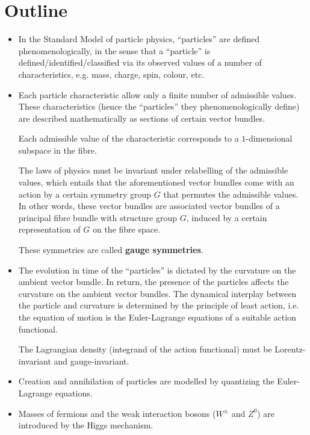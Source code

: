 

\chapter{Outline}
\setcounter{theorem}{0}
\setcounter{equation}{0}


\renewcommand{\theenumi}{\roman{enumi}}
\renewcommand{\labelenumi}{\textnormal{(\theenumi)}$\;\;$}


\begin{itemize}
\item
	In the Standard Model of particle physics, ``particles'' are defined
	phenomenologically, in the sense that a ``particle'' is defined/identified/classified
	via its observed values of a number of characteristics,
	e.g. mass, charge, spin, colour, etc.
\item
	Each particle characteristic allow only a finite number of admissible values.
	These characteristics (hence the ``particles'' they phenomenologically define)
	are described mathematically as sections of certain vector bundles.
	
	Each admissible value of the characteristic corresponds
	to a $1$-dimensional subspace in the fibre.
	
	The laws of physics must be invariant under relabelling of the admissible values,
	which entails that the aforementioned vector bundles come with an action by a certain
	symmetry group $G$ that permutes the admissible values.
	In other words, these vector bundles are associated vector bundles of a
	principal fibre bundle with structure group $G$, induced by a certain representation
	of $G$ on the fibre space.
	
	These symmetries are called \textbf{gauge symmetries}.
\item
	The evolution in time of the ``particles'' is dictated by the curvature on the ambient vector bundle.
	In return, the presence of the particles affects the curvature on the ambient vector bundles.
	The dynamical interplay between the particle and curvature is determined by the principle
	of least action, i.e. the equation of motion is the Euler-Lagrange equations of a suitable
	action functional.
	
	The Lagrangian density (integrand of the action functional) must be
	Lorentz-invariant and gauge-invariant.
\item
	Creation and annihilation of particles are modelled by quantizing
	the Euler-Lagrange equations. 
\item
	Masses of fermions and the weak interaction bosons ($W^{\pm}$ and $Z^{0}$)
	are introduced by the Higgs mechanism.
	

\end{itemize}
